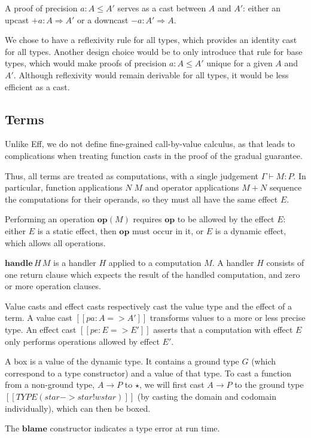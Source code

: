 A proof of precision $a : A \le A'$ serves as a cast between $A$ and $A'$:
either an upcast $+a : A \Rightarrow A'$ or a downcast $-a : A' \Rightarrow A$.

We chose to have a reflexivity rule for all types, which provides an
identity cast for all types. Another design choice would be to only introduce
that rule for base types, which would make proofs of precision $a : A \le A'$
unique for a given $A$ and $A'$. Although reflexivity would remain derivable
for all types, it would be less efficient as a cast.

\subsection{Terms}

Unlike Eff, we do not define fine-grained call-by-value calculus, as that leads
to complications when treating function casts in the proof of the gradual guarantee.

Thus, all terms are treated as computations, with a single judgement $\Gamma \vdash M : P$.
In particular, function applications $N\;M$ and operator applications $M + N$
sequence the computations for their operands, so they must all have the same
effect $E$.

Performing an operation $\mathbf{op}(M)$ requires $\mathbf{op}$ to be allowed
by the effect $E$: either $E$ is a static effect, then $\mathbf{op}$ must occur
in it, or $E$ is a dynamic effect, which allows all operations.

$\mathbf{handle}\,H\,M$ is a handler $H$ applied to a computation $M$.
A handler $H$ consists of one return clause which expects the result of the
handled computation, and zero or more operation clauses.

Value casts and effect casts respectively cast the value type and the effect of a term.
A value cast $[[pa : A => A']]$ transforms values to a more or less precise type.
An effect cast $[[pe : E => E']]$ asserts that a computation with effect $E$
only performs operations allowed by effect $E'$.

A box is a value of the dynamic type. It contains a ground type $G$
(which correspond to a type constructor) and a value of that type.
To cast a function from a non-ground type, $A \to P$ to $\star$,
we will first cast $A \to P$ to the ground type
$[[TYPE ( star -> star ! wstar )]]$ (by casting the domain and codomain individually),
which can then be boxed.

The $\mathbf{blame}$ constructor indicates a type error at run time.

